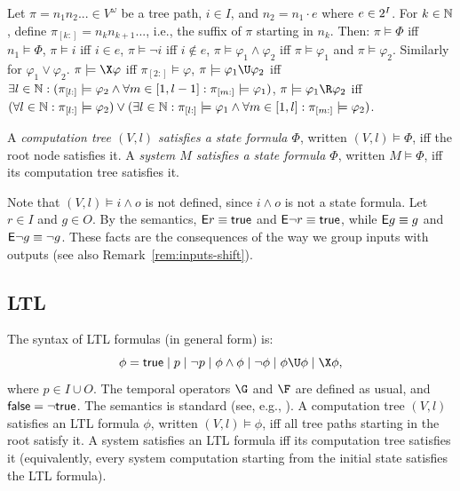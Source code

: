 Let $\pi = n_1 n_2 ... \in V^\omega$ be a tree path,
$i \in I$, and $n_2 = n_1 \cdot e$ where $e \in {2^I}$.
For $k \in \mathbb{N}$, define $\pi_{[k:]} = n_k n_{k+1} ...$,
i.e., the suffix of $\pi$ starting in $n_k$.
Then:
\li
\- $\pi \models \Phi$ iff $n_1 \models \Phi$,
\-[+] $\pi \models i$ iff $i \in e$, $\pi \models \neg i$ iff $i \not\in e$,
\- $\pi \models \varphi_1 \land \varphi_2$ iff $\pi \models \varphi_1$ and $\pi \models \varphi_2$.
   Similarly for $\varphi_1 \lor \varphi_2$.
\- $\pi \models \X \varphi$ iff $\pi_{[2:]} \models \varphi$,
\- $\pi \models \varphi_1 \U \varphi_2$ iff
   $\exists l\in\mathbb{N}: (\pi_{[l:]} \models \varphi_2 \land \forall m \in [1,l-1]: \pi_{[m:]} \models \varphi_1)$,
\- $\pi \models \varphi_1 \R \varphi_2$ iff
   $(\forall l\in\mathbb{N}: \pi_{[l:]} \models \varphi_2) \lor 
    (\exists l\in\mathbb{N}: \pi_{[l:]} \models \varphi_1 \land \forall m\in [1,l]: \pi_{[m:]} \models \varphi_2)$.
\il

A \emph{computation tree $(V,l)$ satisfies a \CTLstar state formula $\Phi$},
written $(V,l) \models \Phi$,
iff the root node satisfies it.
A \emph{system $M$ satisfies a \CTLstar state formula $\Phi$},
written $M \models \Phi$,
iff its computation tree satisfies it.

\begin{remark}[Subtleties]\label{rem:ctlstar-subtle}
Note that $(V,l) \models i\land o$ is not defined,
since $i \land o$ is not a state formula.
Let $r \in I$ and $g \in O$.
By the semantics, ${\operatorname{\mathsf{E}}} r \equiv \textsf{true}$ and ${\operatorname{\mathsf{E}}} \neg r \equiv \textsf{true}$,
while ${\operatorname{\mathsf{E}}} g \equiv g$ and ${\operatorname{\mathsf{E}}} \neg g \equiv \neg g$.
These facts are the consequences of the way we group inputs with outputs
(see also Remark~\ref{rem:inputs-shift}).
\end{remark}


\subsection*{LTL}
The syntax of LTL formulas (in general form) is:
$$
\phi = \true \| p \| \neg p \| \phi \land \phi \| \neg \phi \| \phi \U \phi \| \X \phi,
$$
where $p \in I \cup O$.
The temporal operators $\G$ and $\F$ are defined as usual,
and $\textsf{false} = \neg \textsf{true}$.
The semantics is standard (see, e.g., \cite{PrinciplesMC}).
A computation tree $(V,l)$ satisfies an LTL formula $\phi$,
written $(V,l) \models \phi$,
iff all tree paths starting in the root satisfy it.
A system satisfies an LTL formula iff its computation tree satisfies it
(equivalently, every system computation starting from the initial state
 satisfies the LTL formula).


